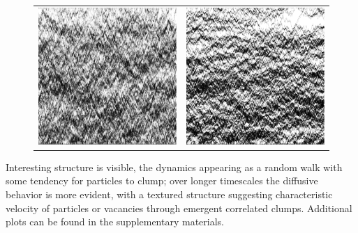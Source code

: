 \documentclass[
reprint, amsmath,amssymb,
]{revtex4-1}
\begin{document}
\begin{figure}[h!]
\begin{center}
\begin{tabular}{c | c}
    \hline
    \includegraphics[width=0.49\linewidth]{longTime} &\includegraphics[width=0.49\linewidth]{midLongTime}
    \end{tabular}
\end{center}
    \vspace{-0em}
\end{figure}

Interesting structure is visible, the dynamics appearing as a random walk with
some tendency for particles to clump; over longer timescales the
diffusive behavior is more evident, with a textured structure
suggesting characteristic velocity of particles or vacancies through
emergent correlated clumps.  Additional plots can be found in the
supplementary materials.
\end{document}
